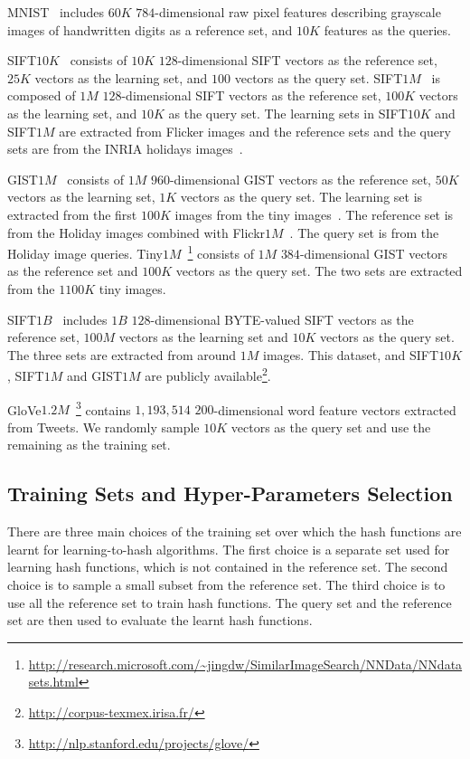 \documentclass[10pt,journal,compsoc]{IEEEtran}
\begin{document}
MNIST~\cite{LeCunBBH01} includes $60K$ $784$-dimensional raw pixel features
describing grayscale images of handwritten digits
as a reference set,
and $10K$ features as the queries.

SIFT$10K$~\cite{JegouDS11}
consists of
$10K$ $128$-dimensional SIFT vectors as the reference set,
$25K$ vectors as the learning set,
and $100$ vectors as the query set.
SIFT$1M$~\cite{JegouDS11} is composed of $1M$
$128$-dimensional SIFT vectors
as the reference set,
$100K$ vectors as the learning set,
and $10K$ as the query set.
The learning sets in SIFT$10K$ and SIFT$1M$
are extracted from Flicker images
and the reference sets and the query sets
are from the INRIA holidays images~\cite{JegouDS08}.


GIST$1M$~\cite{JegouDS11}
consists of $1M$ $960$-dimensional GIST vectors as the reference set,
$50K$ vectors as the learning set,
$1K$ vectors as the query set.
The learning set is extracted from the first $100K$ images
from the tiny images~\cite{TorralbaFF08}.
The reference set is from the Holiday images
combined with Flickr$1M$~\cite{JegouDS08}.
The query set is from the Holiday image queries.
Tiny$1M$~\cite{WangWJLZZH13}\footnote{\url{http://research.microsoft.com/~jingdw/SimilarImageSearch/NNData/NNdatasets.html}}
consists of $1M$ $384$-dimensional GIST vectors as the reference set
and $100K$ vectors as the query set.
The two sets are extracted from the $1100K$ tiny images.

SIFT$1B$~\cite{JegouTDA11}
includes $1B$ $128$-dimensional BYTE-valued SIFT vectors as the reference set,
$100M$ vectors as the learning set
and $10K$ vectors as the query set.
The three sets are extracted from around $1M$ images.
This dataset, and SIFT$10K$, SIFT$1M$ and GIST$1M$
are publicly available\footnote{\url{http://corpus-texmex.irisa.fr/}}.

GloVe$1.2M$~\cite{pennington2014glove}\footnote{\url{http://nlp.stanford.edu/projects/glove/}}
contains $1,193,514$ $200$-dimensional word feature vectors extracted from Tweets.
We randomly sample $10K$ vectors as the query set
and use the remaining as the training set.




\subsection{Training Sets and Hyper-Parameters Selection}
There are three main choices of the training set
over which the hash functions are learnt
for learning-to-hash algorithms.
The first choice is a separate set
used for learning hash functions,
which is not contained in the reference set.
The second choice is to sample a small subset
from the reference set.
The third choice is to use all the reference set
to train hash functions.
The query set and the reference set
are then used to evaluate the learnt hash functions.
\end{document}
